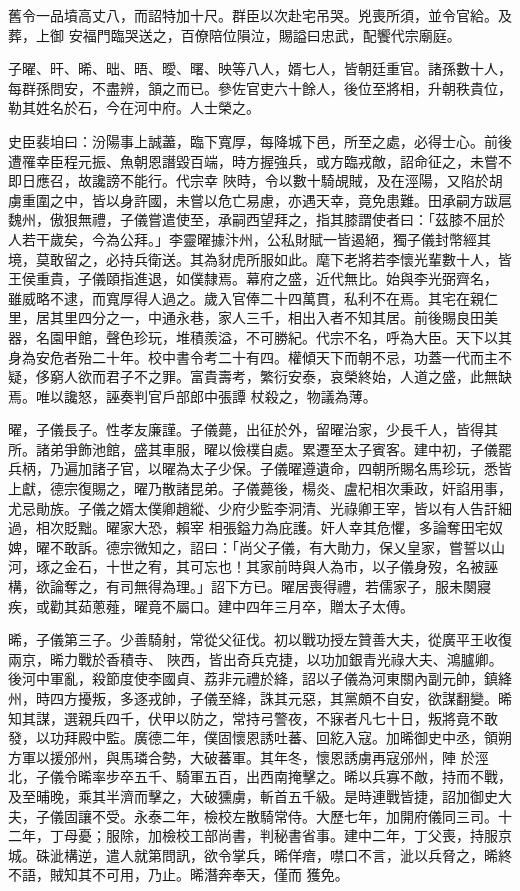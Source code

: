 \begin{pinyinscope}
 舊令一品墳高丈八，而詔特加十尺。群臣以次赴宅吊哭。兇喪所須，並令官給。及葬，上御
 安福門臨哭送之，百僚陪位隕泣，賜謚曰忠武，配饗代宗廟庭。



 子曜、旰、晞、昢、晤、曖、曙、映等八人，婿七人，皆朝廷重官。諸孫數十人，每群孫問安，不盡辨，頷之而已。參佐官吏六十餘人，後位至將相，升朝秩貴位，勒其姓名於石，今在河中府。人士榮之。



 史臣裴垍曰：汾陽事上誠藎，臨下寬厚，每降城下邑，所至之處，必得士心。前後遭罹幸臣程元振、魚朝恩譖毀百端，時方握強兵，或方臨戎敵，詔命征之，未嘗不即日應召，故讒謗不能行。代宗幸
 陜時，令以數十騎覘賊，及在涇陽，又陷於胡虜重圍之中，皆以身許國，未嘗以危亡易慮，亦遇天幸，竟免患難。田承嗣方跋扈魏州，傲狠無禮，子儀嘗遣使至，承嗣西望拜之，指其膝謂使者曰：「茲膝不屈於人若干歲矣，今為公拜。」李靈曜據汴州，公私財賦一皆遏絕，獨子儀封幣經其境，莫敢留之，必持兵衛送。其為豺虎所服如此。麾下老將若李懷光輩數十人，皆王侯重貴，子儀頤指進退，如僕隸焉。幕府之盛，近代無比。始與李光弼齊名，
 雖威略不逮，而寬厚得人過之。歲入官俸二十四萬貫，私利不在焉。其宅在親仁里，居其里四分之一，中通永巷，家人三千，相出入者不知其居。前後賜良田美器，名園甲館，聲色珍玩，堆積羨溢，不可勝紀。代宗不名，呼為大臣。天下以其身為安危者殆二十年。校中書令考二十有四。權傾天下而朝不忌，功蓋一代而主不疑，侈窮人欲而君子不之罪。富貴壽考，繁衍安泰，哀榮終始，人道之盛，此無缺焉。唯以讒怒，誣奏判官戶部郎中張譚
 杖殺之，物議為薄。



 曜，子儀長子。性孝友廉謹。子儀薨，出征於外，留曜治家，少長千人，皆得其所。諸弟爭飾池館，盛其車服，曜以儉樸自處。累遷至太子賓客。建中初，子儀罷兵柄，乃遍加諸子官，以曜為太子少保。子儀曜遵遺命，四朝所賜名馬珍玩，悉皆上獻，德宗復賜之，曜乃散諸昆弟。子儀薨後，楊炎、盧杞相次秉政，奸諂用事，尤忌勛族。子儀之婿太僕卿趙縱、少府少監李洞清、光祿卿王宰，皆以有人告訐細過，相次貶黜。曜家大恐，賴宰
 相張鎰力為庇護。奸人幸其危懼，多論奪田宅奴婢，曜不敢訴。德宗微知之，詔曰：「尚父子儀，有大勛力，保乂皇家，嘗誓以山河，琢之金石，十世之宥，其可忘也！其家前時與人為市，以子儀身歿，名被誣構，欲論奪之，有司無得為理。」詔下方已。曜居喪得禮，若儒家子，服未闋寢疾，或勸其茹蔥薤，曜竟不屬口。建中四年三月卒，贈太子太傅。



 晞，子儀第三子。少善騎射，常從父征伐。初以戰功授左贊善大夫，從廣平王收復兩京，晞力戰於香積寺、
 陜西，皆出奇兵克捷，以功加銀青光祿大夫、鴻臚卿。後河中軍亂，殺節度使李國貞、荔非元禮於絳，詔以子儀為河東關內副元帥，鎮絳州，時四方擾叛，多逐戎帥，子儀至絳，誅其元惡，其黨頗不自安，欲謀翻變。晞知其謀，選親兵四千，伏甲以防之，常持弓警夜，不寐者凡七十日，叛將竟不敢發，以功拜殿中監。廣德二年，僕固懷恩誘吐蕃、回紇入寇。加晞御史中丞，領朔方軍以援邠州，與馬璘合勢，大破蕃軍。其年冬，懷恩誘虜再寇邠州，陣
 於涇北，子儀令晞率步卒五千、騎軍五百，出西南掩擊之。晞以兵寡不敵，持而不戰，及至晡晚，乘其半濟而擊之，大破獯虜，斬首五千級。是時連戰皆捷，詔加御史大夫，子儀固讓不受。永泰二年，檢校左散騎常侍。大歷七年，加開府儀同三司。十二年，丁母憂；服除，加檢校工部尚書，判秘書省事。建中二年，丁父喪，持服京城。硃泚構逆，遣人就第問訊，欲令掌兵，晞佯瘖，噤口不言，泚以兵脅之，晞終不語，賊知其不可用，乃止。晞潛奔奉天，僅而
 獲免。




\end{pinyinscope}

